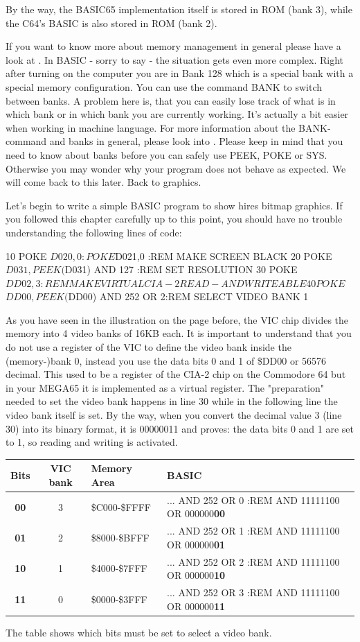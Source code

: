 By the way, the BASIC65 implementation itself is stored in ROM (bank 3), while the C64's BASIC is also stored in ROM (bank 2).

If you want to know more about memory management in general please have a look at . In BASIC - sorry to say - the situation gets even more complex. Right after turning on the computer you are in Bank 128 which is a special bank with a special memory configuration. You can use the command BANK to switch between banks. A problem here is, that you can easily lose track of what is in which bank or in which bank you are currently working. It's actually a bit easier when working in machine language. For more information about the BANK-command and banks in general, please look into . Please keep in mind that you need to know about banks before you can safely use PEEK, POKE or SYS. Otherwise you may wonder why your program does not behave as expected. We will come back to this later. Back to graphics. 

Let's begin to write a simple BASIC program to show hires bitmap graphics. If you followed this chapter carefully up to this point, you should have no trouble understanding the following lines of code:

\begin{screenoutput}
10 POKE $D020,0 : POKE $D021,0          :REM MAKE SCREEN BLACK
20 POKE $D031, PEEK($D031) AND 127      :REM SET RESOLUTION
30 POKE $DD02, 3                        :REM MAKE VIRTUAL CIA-2 READ- AND WRITEABLE 
40 POKE $$DD00, PEEK($DD00) AND 252 OR 2:REM SELECT VIDEO BANK 1
\end{screenoutput}

As you have seen in the illustration on the page before, the VIC chip divides the memory into 4 video banks of 16KB each. It is important to understand that you do not use a register of the VIC to define the video bank inside the (memory-)bank 0, instead you use the data bits 0 and 1 of \$DD00 or 56576 decimal. This used to be a register of the CIA-2 chip on the Commodore 64 but in your MEGA65 it is implemented as a virtual register. The "preparation" needed to set the video bank happens in line 30 while in the following line the video bank itself is set. By the way, when you convert the decimal value 3 (line 30) into its binary format, it is 00000011 and proves: the data bits 0 and 1 are set to 1, so reading and writing is activated.

\begin{tabular}{|c|c|l|l|}
	\hline
	Bits & VIC bank & Memory Area & BASIC \\
	\hline
	 \textbf{00} & 3 & \$C000-\$FFFF & ... AND 252 OR 0 :REM AND 11111100 OR 000000\textbf{00} \\
	 \textbf{01} & 2 & \$8000-\$BFFF & ... AND 252 OR 1 :REM AND 11111100 OR 000000\textbf{01} \\
	 \textbf{10} & 1 & \$4000-\$7FFF & ... AND 252 OR 2 :REM AND 11111100 OR 000000\textbf{10} \\
	 \textbf{11} & 0 & \$0000-\$3FFF & ... AND 252 OR 3 :REM AND 11111100 OR 000000\textbf{11} \\
	\hline
\end{tabular}

The table shows which bits must be set to select a video bank. 
